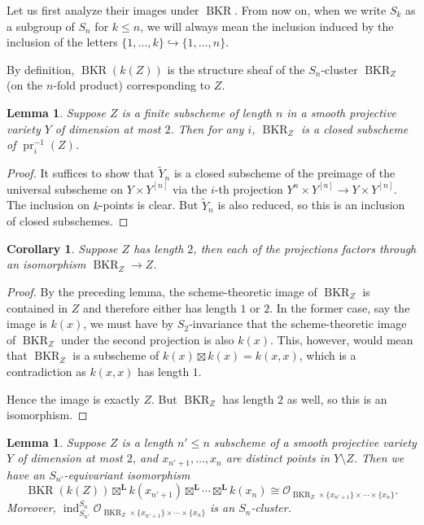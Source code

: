 \documentclass{amsart}
\theoremstyle{plain}
\newtheorem{lemma}[theorem]{Lemma}
\newtheorem{corollary}[theorem]{Corollary}
\theoremstyle{definition}
\theoremstyle{remark}
\begin{document}
    Let us first analyze their images under $\operatorname{BKR}$.
    From now on, when we write $S_k$ as a subgroup of $S_n$ for $k\le n$, we will always mean the inclusion induced by the inclusion of the letters $\{1,\ldots,k\}\hookrightarrow \{1,\ldots, n\}$.

    By definition, $\operatorname{BKR}(k(Z))$ is the structure sheaf of the $S_n$-cluster $\operatorname{BKR}_Z$ (on the $n$-fold product) corresponding to $Z$.
    \begin{lemma}\label{cluster_projection}
        Suppose $Z$ is a finite subscheme of length $n$ in a smooth projective variety $Y$ of dimension at most $2$.
        Then for any $i$, $\operatorname{BKR}_Z$ is a closed subscheme of $\operatorname{pr}_i^{-1}(Z)$.
    \end{lemma}
    \begin{proof}
        It suffices to show that $\tilde{Y}_n$ is a closed subscheme of the preimage of the universal subscheme on $Y\times Y^{[n]}$ via the $i$-th projection $Y^n\times Y^{[n]}\to Y\times Y^{[n]}$.
        The inclusion on $k$-points is clear.
        But $\tilde{Y}_n$ is also reduced, so this is an inclusion of closed subschemes.
    \end{proof}
    \begin{corollary}\label{proj_isom_mult2}
        Suppose $Z$ has length $2$, then each of the projections factors through an isomorphism $\operatorname{BKR}_Z\to Z$.
    \end{corollary}
    \begin{proof}
        By the preceding lemma, the scheme-theoretic image of $\operatorname{BKR}_Z$ is contained in $Z$ and therefore either has length $1$ or $2$.
        In the former case, say the image is $k(x)$, we must have by $S_2$-invariance that the scheme-theoretic image of $\operatorname{BKR}_Z$ under the second projection is also $k(x)$.
        This, however, would mean that $\operatorname{BKR}_Z$ is a subscheme of $k(x)\boxtimes k(x)=k(x,x)$, which is a contradiction as $k(x,x)$ has length $1$.

        Hence the image is exactly $Z$.
        But $\operatorname{BKR}_Z$ has length $2$ as well, so this is an isomorphism.
    \end{proof}
    \begin{lemma}
        Suppose $Z$ is a length $n'\le n$ subscheme of a smooth projective variety $Y$ of dimension at most $2$, and $x_{n'+1},\ldots,x_n$ are distinct points in $Y\setminus Z$.
        Then we have an $S_{n'}$-equivariant isomorphism
        \[\operatorname{BKR}(k(Z))\boxtimes^{\mathbf L} k(x_{n'+1})\boxtimes^{\mathbf L}\cdots\boxtimes^{\mathbf L} k(x_n)\cong\mathcal O_{\operatorname{BKR}_Z\times \{x_{n'+1}\}\times \cdots\times\{x_n\}}.\]
        Moreover, $\operatorname{ind}_{S_{n'}}^{S_n}\mathcal O_{\operatorname{BKR}_Z\times \{x_{n'+1}\}\times \cdots\times\{x_n\}}$ is an $S_n$-cluster.
    \end{lemma}
\end{document}
